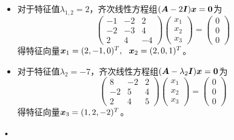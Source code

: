         \begin{frame}
          
          \begin{itemize}
          \item 对于特征值$\lambda_{1,2}=2$，齐次线性方程组$(\MA-2\MI)\vx=\M0$为
            $$
            \left(
              \begin{array}{rrr}
                -1&-2& 2\\
                -2&-3& 4\\
                2& 4&-4
              \end{array}
            \right)\left(
              \begin{array}{r}
                x_1\\
                x_2\\
                x_3
              \end{array}
            \right)=\left(
              \begin{array}{r}
                0\\
                0\\
                0
              \end{array}
            \right)
            $$
            得特征向量${\boldsymbol{x}}_1=(2,-1,0)^T,~~{\boldsymbol{x}}_2=(2,0,1)^T$。 \\[0.1in]
          \item 
            对于特征值$\lambda_2=-7$，齐次线性方程组$(\MA-\lambda_2\MI)\vx=\M0$为
            $$
            \left(
              \begin{array}{rrr}
                8&-2&2\\
                -2&5&4\\
                2&4&5
              \end{array}
            \right)\left(
              \begin{array}{r}
                x_1\\
                x_2\\
                x_3
              \end{array}
            \right)=\left(
              \begin{array}{r}
                0\\
                0\\
                0
              \end{array}
            \right)
            $$
            得特征向量${\boldsymbol{x}}_3=(1,2,-2)^T$。
          \end{itemize}•
          


          
          
        \end{frame}


